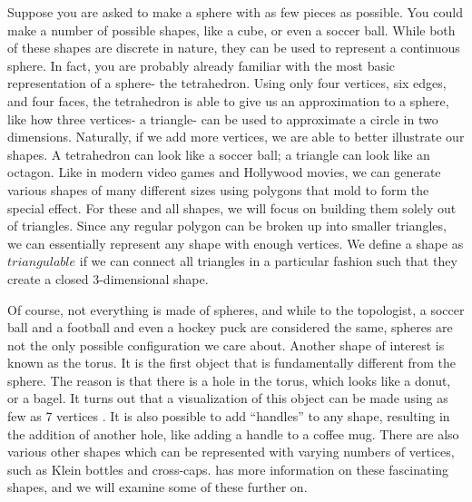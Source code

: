 \documentclass[12pt]{article}
\begin{document}
Suppose you are asked to make a sphere with as few pieces as possible. You could make a number of possible shapes, like a cube, or even a soccer ball. While both of these shapes are discrete in nature, they can be used to represent a continuous sphere. In fact, you are probably already familiar with the most basic representation of a sphere- the tetrahedron. Using only four vertices, six edges, and four faces, the tetrahedron is able to give us an approximation to a sphere, like how three vertices- a triangle- can be used to approximate a circle in two dimensions. Naturally, if we add more vertices, we are able to better illustrate our shapes. A tetrahedron can look like a soccer ball; a triangle can look like an octagon. Like in modern video games and Hollywood movies, we can generate various shapes of many different sizes using polygons that mold to form the special effect. For these and all shapes, we will focus on building them solely out of triangles. Since any regular polygon can be broken up into smaller triangles, we can essentially represent any shape with enough vertices. We define a shape as $triangulable$ if we can connect all triangles in a particular fashion such that they create a closed 3-dimensional shape.\newline
  
\noindent Of course, not everything is made of spheres, and while to the topologist, a soccer ball and a football and even a hockey puck are considered the same, spheres are not the only possible configuration we care about. Another shape of interest is known as the torus. It is the first object that is fundamentally different from the sphere. The reason is that there is a hole in the torus, which looks like a donut, or a bagel. It turns out that a visualization of this object can be made using as few as 7 vertices \cite{lutzmanifold}. It is also possible to add ``handles'' to any shape, resulting in the addition of another hole, like adding a handle to a coffee mug. There are also various other shapes which can be represented with varying numbers of vertices, such as Klein bottles and cross-caps. \cite{WolfMath} has more information on these fascinating shapes, and we will examine some of these further on.\newline
 
\end{document}
